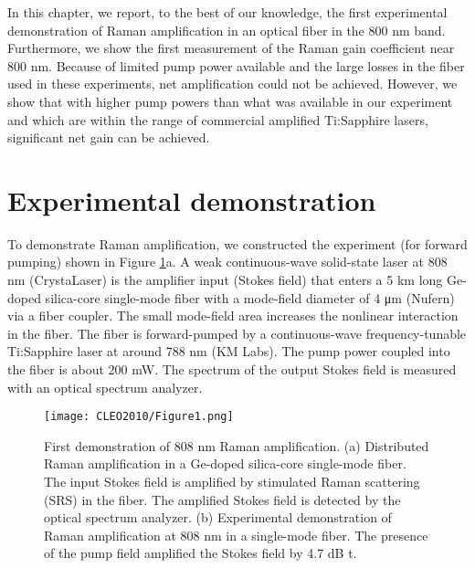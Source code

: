 In this chapter, we report, to the best of our knowledge, the first experimental demonstration of Raman amplification in an optical fiber in the 800 nm band. Furthermore, we show the first measurement of the Raman gain coefficient near 800 nm. Because of limited pump power available and the large losses in the fiber used in these experiments, net amplification could not be achieved. However, we show that with higher pump powers than what was available in our experiment and which are within the range of commercial amplified Ti:Sapphire lasers, significant net gain can be achieved. 

\section{Experimental demonstration}

To demonstrate Raman amplification, we constructed the experiment (for forward pumping) shown in Figure \ref{fig:CLEO2010_Figure1}a. A weak continuous-wave solid-state laser at 808 nm (CrystaLaser) is the amplifier input (Stokes field) that enters a 5 km long Ge-doped silica-core single-mode fiber with a mode-field diameter of 4 μm (Nufern) via a fiber coupler. The small mode-field area increases the nonlinear interaction in the fiber. The fiber is forward-pumped by a continuous-wave frequency-tunable Ti:Sapphire laser at around 788 nm (KM Labs). The pump power coupled into the fiber is about 200 mW. The spectrum of the output Stokes field is measured with an optical spectrum analyzer. 

\begin{figure}[htb!]
\centering
\texttt{[image: CLEO2010/Figure1.png]}
\caption{First demonstration of 808 nm Raman amplification. (a) Distributed Raman amplification in a Ge-doped silica-core single-mode fiber. The input Stokes field is amplified by stimulated Raman scattering (SRS) in the fiber. The amplified Stokes field is detected by the optical spectrum analyzer. (b) Experimental demonstration of Raman amplification at 808 nm in a single-mode fiber. The presence of the pump field amplified the Stokes field by 4.7 dB t.}
\label{fig:CLEO2010_Figure1}
\end{figure}

